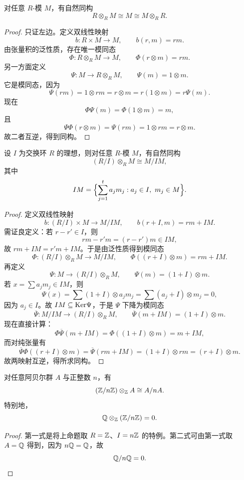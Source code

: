 \begin{proposition}
对任意 $R$-模 $M$，有自然同构
\[
R\otimes_R M\cong M\cong M\otimes_R R.
\]
\end{proposition}

\begin{proof}
只证左边。定义双线性映射
\[
b\colon R\times M\to M,
\qquad b(r,m)=rm.
\]
由张量积的泛性质，存在唯一模同态
\[
\Phi\colon R\otimes_R M\to M,
\qquad \Phi(r\otimes m)=rm.
\]
另一方面定义
\[
\Psi\colon M\to R\otimes_R M,
\qquad \Psi(m)=1\otimes m.
\]
它是模同态，因为
\[
\Psi(rm)=1\otimes rm=r\otimes m=r(1\otimes m)=r\Psi(m).
\]
现在
\[
\Phi\Psi(m)=\Phi(1\otimes m)=m,
\]
且
\[
\Psi\Phi(r\otimes m)=\Psi(rm)=1\otimes rm=r\otimes m.
\]
故二者互逆，得到同构。
\end{proof}

\begin{proposition}
设 $I$ 为交换环 $R$ 的理想，则对任意 $R$-模 $M$，有自然同构
\[
(R/I)\otimes_R M\cong M/IM,
\]
其中
\[
IM=\Bigl\{\sum_{j=1}^t a_jm_j: a_j\in I,\ m_j\in M\Bigr\}.
\]
\end{proposition}

\begin{proof}
定义双线性映射
\[
b\colon (R/I)\times M\to M/IM,
\qquad b(r+I,m)=rm+IM.
\]
需证良定义：若 $r-r'\in I$，则
\[
rm-r'm=(r-r')m\in IM,
\]
故 $rm+IM=r'm+IM$。于是由泛性质得到模同态
\[
\Phi\colon (R/I)\otimes_R M\to M/IM,
\qquad \Phi((r+I)\otimes m)=rm+IM.
\]
再定义
\[
\Psi\colon M\to (R/I)\otimes_R M,
\qquad \Psi(m)=(1+I)\otimes m.
\]
若 $x=\sum a_jm_j\in IM$，则
\[
\Psi(x)=\sum (1+I)\otimes a_jm_j=\sum (a_j+I)\otimes m_j=0,
\]
因为 $a_j\in I$。故 $IM\subseteq \mathrm{Ker}\Psi$，于是 $\Psi$ 下降为模同态
\[
\overline\Psi\colon M/IM\to (R/I)\otimes_R M,
\qquad \overline\Psi(m+IM)=(1+I)\otimes m.
\]
现在直接计算：
\[
\Phi\overline\Psi(m+IM)=\Phi((1+I)\otimes m)=m+IM,
\]
而对纯张量有
\[
\overline\Psi\Phi((r+I)\otimes m)=\overline\Psi(rm+IM)=(1+I)\otimes rm=(r+I)\otimes m.
\]
故两映射互逆，得所求同构。
\end{proof}

\begin{corollary}
对任意阿贝尔群 $A$ 与正整数 $n$，有
\[
(\mathbb{Z}/n\mathbb{Z})\otimes_{\mathbb{Z}} A\cong A/nA.
\]
特别地，
\[
\mathbb{Q}\otimes_{\mathbb{Z}} (\mathbb{Z}/n\mathbb{Z})=0.
\]
\end{corollary}

\begin{proof}
第一式是将上命题取 $R=\mathbb{Z}$、$I=n\mathbb{Z}$ 的特例。第二式可由第一式取 $A=\mathbb{Q}$ 得到，因为 $n\mathbb{Q}=\mathbb{Q}$，故
\[
\mathbb{Q}/n\mathbb{Q}=0.
\]
\end{proof}

